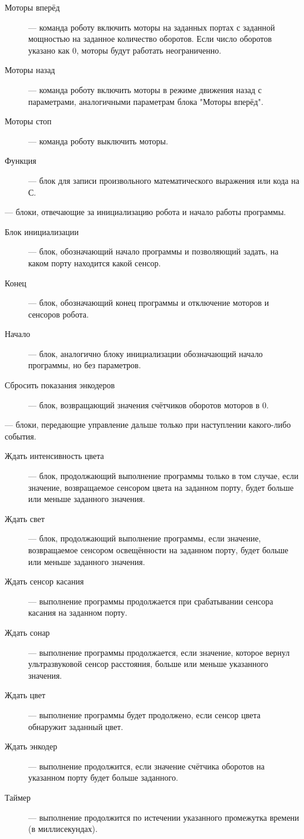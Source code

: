 \documentclass[a4paper]{article}
\begin{document}
\begin{description}
\begin{description}
    \item[Моторы вперёд] --- команда роботу включить моторы на заданных портах с заданной мощностью на заданное количество оборотов. Если число оборотов указано как 0, моторы будут работать неограниченно.
    \item[Моторы назад] --- команда роботу включить моторы в режиме движения назад с параметрами, аналогичными параметрам блока "Моторы вперёд".
    \item[Моторы стоп] --- команда роботу выключить моторы.
    \item[Функция] --- блок для записи произвольного математического выражения или кода на С.
  \end{description}
  \item[Инициализация] --- блоки, отвечающие за инициализацию робота и начало работы программы.
  \begin{description}
    \item[Блок инициализации] --- блок, обозначающий начало программы и позволяющий задать, на каком порту находится какой сенсор.
    \item[Конец] --- блок, обозначающий конец программы и отключение моторов и сенсоров робота.
    \item[Начало] --- блок, аналогично блоку инициализации обозначающий начало программы, но без параметров.
    \item[Сбросить показания энкодеров] --- блок, возвращающий значения счётчиков оборотов моторов в 0.
  \end{description}
  \item[Ожидания] --- блоки, передающие управление дальше только при наступлении какого-либо события.
  \begin{description}
    \item[Ждать интенсивность цвета] --- блок, продолжающий выполнение программы только в том случае, если значение, возвращаемое сенсором цвета на заданном порту, будет больше или меньше заданного значения.
    \item[Ждать свет] --- блок, продолжающий выполнение программы, если значение, возвращаемое сенсором освещённости на заданном порту, будет больше или меньше заданного значения.
    \item[Ждать сенсор касания] --- выполнение программы продолжается при срабатывании сенсора касания на заданном порту.
    \item[Ждать сонар] --- выполнение программы продолжается, если значение, которое вернул ультразвуковой сенсор расстояния, больше или меньше указанного значения.
    \item[Ждать цвет] --- выполнение программы будет продолжено, если сенсор цвета обнаружит заданный цвет.
    \item[Ждать энкодер] --- выполнение продолжится, если значение счётчика оборотов на указанном порту будет больше заданного.
    \item[Таймер] --- выполнение продолжится по истечении указанного промежутка времени (в миллисекундах).
  \end{description}
\end{description}
\end{document}
